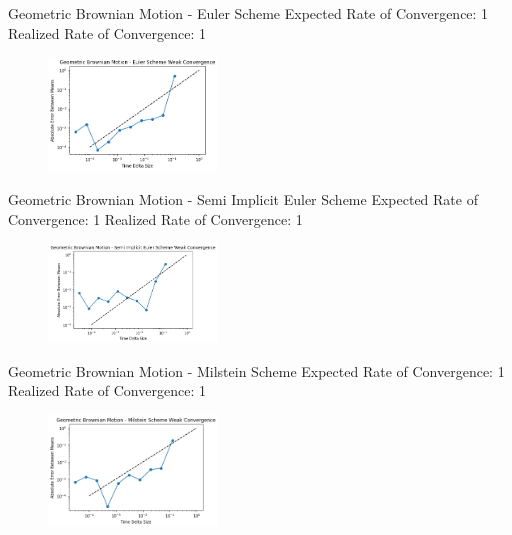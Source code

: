 \documentclass[]{beamer}
\begin{document}
\begin{frame}{Geometric Brownian Motion - Euler Scheme}
Expected Rate of Convergence: 1
\newline
Realized Rate of Convergence: 1
\begin{figure}[t]
\vspace{-1pt}
\captionsetup[figure]{labelformat=empty}
\includegraphics[width=0.4\textwidth]{gbm_euler.png}
\end{figure}
\end{frame}

\begin{frame}{Geometric Brownian Motion - Semi Implicit Euler Scheme}
Expected Rate of Convergence: 1
\newline
Realized Rate of Convergence: 1
\begin{figure}[t]
\vspace{-1pt}
\captionsetup[figure]{labelformat=empty}
\includegraphics[width=0.4\textwidth]{gbm_semi.png}
\end{figure}
\end{frame}

\begin{frame}{Geometric Brownian Motion - Milstein Scheme}
Expected Rate of Convergence: 1
\newline
Realized Rate of Convergence: 1
\begin{figure}[t]
\vspace{-1pt}
\captionsetup[figure]{labelformat=empty}
\includegraphics[width=0.4\textwidth]{gbm_milstein.png}
\end{figure}
\end{frame}
\end{document}
